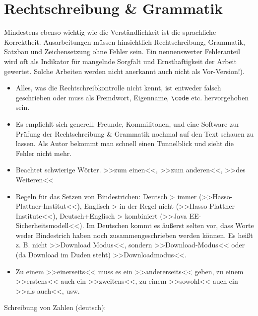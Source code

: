 \section{Rechtschreibung \& Grammatik}

Mindestens ebenso wichtig wie die Verständlichkeit ist die sprachliche Korrektheit. Ausarbeitungen müssen hinsichtlich Rechtschreibung, Grammatik, Satzbau und Zeichensetzung ohne Fehler sein. Ein nennenswerter Fehleranteil wird oft als Indikator für mangelnde Sorgfalt und Ernsthaftigkeit der Arbeit gewertet. Solche Arbeiten werden nicht anerkannt auch nicht als Vor-Version!).

\begin{itemize}
\item Alles, was die Rechtschreibkontrolle nicht kennt, ist entweder falsch geschrieben oder muss als Fremdwort, Eigenname, \verb|\code| etc. hervorgehoben sein.
\item Es empfiehlt sich generell, Freunde, Kommilitonen, und eine Software zur Prüfung der Rechtschreibung \& Grammatik nochmal auf den Text schauen zu lassen. Als Autor bekommt man schnell einen Tunnelblick und sieht die Fehler nicht mehr.
\item Beachtet schwierige Wörter. >>zum einen<<, >>zum anderen<<, >>des Weiteren<<
\item Regeln für das Setzen von Bindestrichen: Deutsch > immer (>>Hasso-Plattner-Institut<<), Englisch > in der Regel nicht (>>Hasso Plattner Institute<<), Deutsch+Englisch > kombiniert (>>Java EE-Sicherheitsmodell<<). Im Deutschen kommt es äußerst selten vor, dass Worte weder Bindestrich haben noch zusammengeschrieben werden können. Es heißt z. B. nicht >>Download Modus<<, sondern >>Download-Modus<< oder (da Download im Duden steht) >>Downloadmodus<<.
\item Zu einem >>einerseits<< muss es ein >>andererseits<< geben, zu einem >>erstens<< auch ein >>zweitens<<, zu einem >>sowohl<< auch ein >>als auch<<, usw.
\end{itemize}

Schreibung von Zahlen (deutsch):

